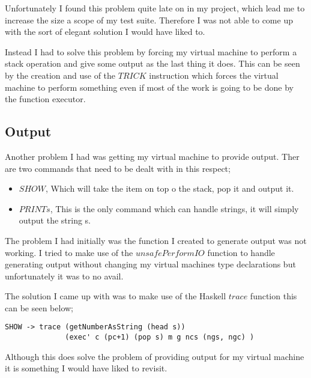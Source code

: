 Unfortunately I found this problem quite late on in my project, which lead me to increase the size a scope of my test suite. Therefore I was not able to come up with the sort of elegant solution I would have liked to. 

Instead I had to solve this problem by forcing my virtual machine to perform a stack operation and give some output as the last thing it does. This can be seen by the creation and use of the $TRICK$ instruction which forces the virtual machine to perform something even if most of the work is going to be done by the function executor. 

\subsection{Output}

Another problem I had was getting my virtual machine to provide output. Ther are two commands that need to be dealt with in this respect;

\begin{itemize}
\item $SHOW$, Which will take the item on top o the stack, pop it and output it.
\item $PRINT s$, This is the only command which can handle strings, it will simply output the string s.
\end{itemize}

The problem I had initially was the function I created to generate output was not working. I tried to make use of the $unsafePerformIO$ function to handle generating output without changing my virtual machines type declarations but unfortunately it was to no avail. 

\newpage

The solution I came up with was to make use of the Haskell $trace$ function this can be seen below;

\begin{lstlisting}
SHOW -> trace (getNumberAsString (head s)) 
              (exec' c (pc+1) (pop s) m g ncs (ngs, ngc) ) 
\end{lstlisting}  

Although this does solve the problem of providing output for my virtual machine it is something I would have liked to revisit. 